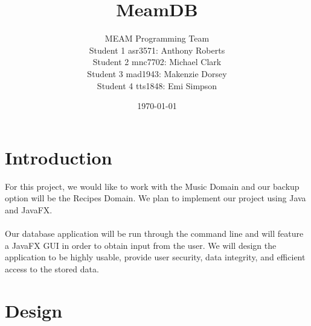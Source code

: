 \documentclass[12pt]{article}
\title{MeamDB}
\date{\today}
\author{MEAM Programming Team \\
Student 1 asr3571: Anthony Roberts\\
Student 2 mnc7702: Michael Clark\\
Student 3 mad1943: Makenzie Dorsey\\
Student 4 tts1848: Emi Simpson\\
}
\begin{document}
    \maketitle

    \section{Introduction}
    For this project, we would like to work with the Music Domain
    and our backup option will be the Recipes Domain. We plan to
    implement our project using Java and JavaFX.
    \\~\\
    \noindent Our database application will be run through the command line
    and will feature a JavaFX GUI in order to obtain input from the
    user. We will design the application to be highly usable, provide
    user security, data integrity, and efficient access to the stored data.

    \section{Design}
\end{document}
